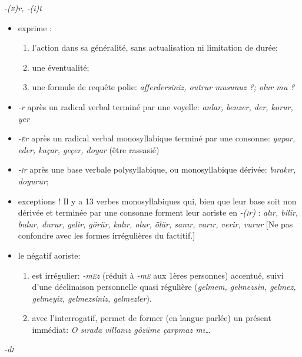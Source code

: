 \documentclass{cours}
\newcommand{\ch}{\c{s}}
\newcommand{\sci}{\textsc{i}}
\newcommand{\sce}{\textsc{e}}
\begin{document}
\begin{description}
\begin{itemize}
          \end{itemize}
    \item [L'éventuel ou \og temps large\fg (geni\ch\ zaman) (aoriste):] \textsl{-(\sce)r, -(i)t}
          \begin{itemize}
              \item exprime :
                    \begin{enumerate}
                        \item l'action dans sa généralité, sans actualisation ni limitation de durée;
                        \item une éventualité;
                        \item une formule de requête polie: \textsl{afferdersiniz, outrur musunuz ?; olur mu ?}
                    \end{enumerate}
              \item \textsl{-r} après un radical verbal terminé par une voyelle: \textsl{anlar, benzer, der, korur, yer}
              \item \textsl{-\sce r} après un radical verbal monosyllabique terminé par une consonne: \textsl{yapar, eder, kaçar, geçer, doyar} (être rassasié)
              \item \textsl{-\sci r} après une base verbale polysyllabique, ou monosyllabique dérivée: \textsl{b\i rak\i r, doyurur};
              \item exceptions ! Il y a 13 verbes monosyllabiques qui, bien que leur base soit non dérivée et terminée par une consonne forment leur aoriste en \textsl{-(\sci r)} : \textsl{al\i r, bilir, bulur, durur, gelir, görür, kal\i r, olur, ölür, san\i r, var\i r, verir, vurur} [Ne pas confondre avec les formes irrégulières du factitif.]
              \item le négatif aoriste:
                    \begin{enumerate}
                        \item est irrégulier: \textsl{-m\sce z} (réduit à \textsl{-m\sce} aux 1ères personnes) accentué, suivi d'une déclinaison personnelle quasi régulière (\textsl{gelmem, gelmezsin, gelmez, gelmeyiz, gelmezsiniz, gelmezler}).
                        \item avec l'interrogatif, permet de former (en langue parlée) un présent immédiat: \textsl{O s\i rada villan\i z gözüme çarpmaz m\i\dots}
                    \end{enumerate}
          \end{itemize}
    \item [Constatif:] \textsl{-d\sci}

\end{description}
\end{document}
